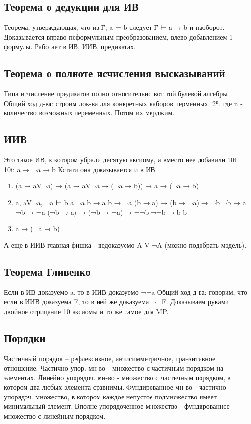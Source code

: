 \documentclass[11pt]{article}
\begin{document}
\subsection{Теорема о дедукции для ИВ}
\label{sec-2-3}
Теорема, утверждающая, что из Г, a ⊢ b следует Г ⊢ a → b и наоборот.
Доказывается вправо поформульным преобразованием, влево
добавлением 1 формулы. Работает в ИВ, ИИВ, предикатах.
\subsection{Теорема о полноте исчисления высказываний}
\label{sec-2-4}
Типа исчисление предикатов полно относительно вот той булевой алгебры.
Общий ход д-ва: строим док-ва для конкретных наборов перменных,
2$^{\text{n}}$, где n - количество возможных переменных. Потом их мерджим.
\subsection{ИИВ}
\label{sec-2-5}
Это такое ИВ, в котором убрали десятую аксиому, а вместо нее
добавили 10i.
10i: a → ¬a → b
Кстати она доказывается и в ИВ
\begin{enumerate}
\item (a → aV¬a) → (a → aV¬a → (¬a → b)) → a → (¬a → b)
\item a, aV¬a, ¬a ⊢ b
a
¬a
b → a
b → ¬a
(b → a) → (b → ¬a) → ¬b
¬b → a
¬b → ¬a
(¬b → a) → (¬b → ¬a) → ¬¬b
¬¬b → b
b
\item a → (¬a → b)
\end{enumerate}
А еще в ИИВ главная фишка - недоказуемо A V ¬A (можно подобрать модель).
\subsection{Теорема Гливенко}
\label{sec-2-6}
Если в ИВ доказуемо a, то в ИИВ доказуемо ¬¬a
Общий ход д-ва: говорим, что если в ИИВ доказуема F,
то в ней же доказуема ¬¬F. Доказываем руками двойное
отрицание 10 аксиомы и то же самое для MP.
\subsection{Порядки}
\label{sec-2-7}
Частичный порядок – рефлексивное, антисимметричное, транзитивное
отношение.
Частично упор. мн-во - множество с частичным порядком на элементах.
Линейно упорядоч. мн-во - множество с частичным порядком, в котором
два любых элемента сравнимы.
Фундированное мн-во - частично упорядоч. множество, в котором каждое
непустое подмножество имеет минимальный элемент.
Вполне упорядоченное множество - фундированное множество с линейным
порядком.
\end{document}
